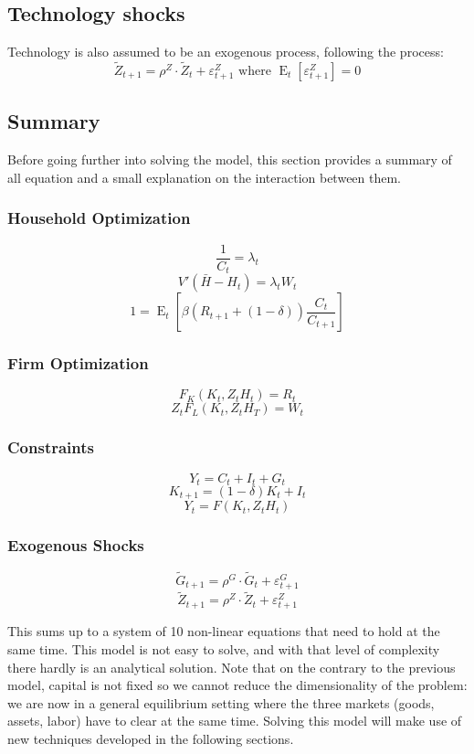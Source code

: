 \documentclass[12pt]{report}
\newcommand{\Et}[1]{\operatorname{E}_t\left[#1\right]}
\begin{document}
\subsection{Technology shocks}

Technology is also assumed to be an exogenous process, following the process: $$\tilde Z_{t+1} = \rho^Z\cdot \tilde Z_{t} + \varepsilon_{t+1}^Z \text{ where } \Et{\varepsilon_{t+1}^Z} = 0 $$

\subsection{Summary}

Before going further into solving the model, this section provides a summary of all equation and a small explanation on the interaction between them.

\subsubsection{Household Optimization}

$$\frac{1}{C_t} = \lambda_t $$ 
$$V'(\bar H - H_t) = \lambda_t W_t $$
$$1 = \Et{\beta(R_{t+1} + (1-\delta))\frac{C_{t}}{C_{t+1}}} $$

\subsubsection{Firm Optimization}

$$F_K(K_t, Z_tH_t) = R_t $$ 
$$ Z_tF_L(K_t, Z_tH_T) = W_t $$

\subsubsection{Constraints}

$$ Y_t = C_t + I_t + G_t $$
$$ K_{t+1} = (1 - \delta)K_t + I_t $$
$$ Y_t = F(K_t, Z_tH_t) $$

\subsubsection{Exogenous Shocks}

$$\tilde G_{t+1} = \rho^G\cdot \tilde G_{t} + \varepsilon_{t+1}^G $$
$$\tilde Z_{t+1} = \rho^Z\cdot \tilde Z_{t} + \varepsilon_{t+1}^Z $$

This sums up to a system of 10 non-linear equations that need to hold at the same time. This model is not easy to solve, and with that level of complexity there hardly is an analytical solution. Note that on the contrary to the previous model, capital is not fixed so we cannot reduce the dimensionality of the problem: we are now in a general equilibrium setting where the three markets (goods, assets, labor) have to clear at the same time. Solving this model will make use of new techniques developed in the following sections.
\end{document}
